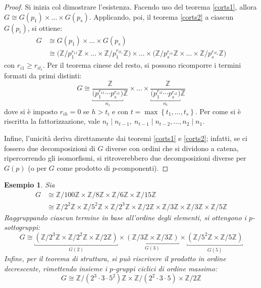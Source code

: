 \documentclass[12pt]{scrartcl}
\theoremstyle{style}
\newtheorem{esempio}{Esempio}[section]
\numberwithin{equation}{subsection}
\begin{document}
	\begin{proof}
		Si inizia col dimostrare l'esistenza. 
		Facendo uso del teorema \ref{corts1}, allora $G \cong G(p_1) \times \ldots \times G(p_s)$. 
		Applicando, poi, il teorema \ref{corts2} a ciascun $G(p_i)$, si ottiene:
		\[
			\begin{split}
				G &\cong G(p_1) \times  \ldots \times G(p_s) \\
				  &\cong \Big(\mathbb{Z}/p_1^{r_{11} }\mathbb{Z} \times \ldots \times \mathbb{Z}/ p_1^{r_{1t_1} }\mathbb{Z}\Big) \times  \ldots \times \Big(\mathbb{Z}/ p_s^{r_{s1} }\mathbb{Z}\times  \ldots\times \mathbb{Z}/p_s^{r_{st_s} }\mathbb{Z}  \Big) 
			\end{split}
		\] 
		con $r_{i 1} \ge r_{i t_i} $. 
		Per il teorema cinese del resto, si possono ricomporre i termini formati da primi distinti:
		\[
			G\cong \frac{\mathbb{Z}}{\underbracket{\big(p_1^{r_{11}} \cdots p_s^{r_{s 1} } \big)}_{n_1} \mathbb{Z}} \times  \ldots \times \frac{\mathbb{Z}}{ \underbracket{\big(p_1^{r_{1t} }\cdots p_s^{r_{st} } \big)}_{n_t} \mathbb{Z}}
		\] 
	dove si \`e imposto $r_{ih} =0$ se $h>t_i$ e con $t = \max \left\{ t_1,\ldots,t_s \right\} $.
	Per come si \`e riscritta la fattorizzazione, vale $n_t  \mid  n_{t-1} , \ n_{t-1}  \mid n_{t-2} , \ldots, n_2 \mid n_1$.

	Infine, l'unicit\`a deriva direttamente dai teoremi \ref{corts1} e \ref{corts2}; infatti, se ci fossero due decomposizioni di $G$ diverse con ordini che si dividono a catena, ripercorrendo gli isomorfismi, si ritroverebbero due decomposizioni diverse per $G(p)$ (o per $G$ come prodotto di $p$-componenti).
	\end{proof}
\begin{esempio}
	Sia 
	\[
		\begin{split}
			G &\cong \mathbb{Z}/100\mathbb{Z} \times \mathbb{Z}/8\mathbb{Z} \times \mathbb{Z}/6\mathbb{Z} \times  \mathbb{Z}/15\mathbb{Z}\\
			  &\cong \mathbb{Z}/2^2\mathbb{Z} \times \mathbb{Z}/5^2\mathbb{Z}\times \mathbb{Z}/2^3 \mathbb{Z}\times \mathbb{Z}/2\mathbb{Z} \times \mathbb{Z}/3\mathbb{Z}\times \mathbb{Z}/3\mathbb{Z}\times \mathbb{Z}/5\mathbb{Z}
		\end{split}
	\] 
	Raggruppando ciascun termine in base all'ordine degli elementi, si ottengono i $p$-sottogruppi:
	\[
		G\cong \underbracket{\left(\mathbb{Z}/2^3 \mathbb{Z}\times \mathbb{Z}/2^2\mathbb{Z} \times \mathbb{Z}/2\mathbb{Z}\right)}_{G(2)}  \times \underbracket{\left(\mathbb{Z}/3\mathbb{Z} \times \mathbb{Z}/3\mathbb{Z}\right) }_{G(3)} \times \underbracket{\left(\mathbb{Z}/5^2 \mathbb{Z} \times \mathbb{Z}/5\mathbb{Z}\right) }_{G(5)} 
	\] 
	Infine, per il teorema di struttura, si pu\`o riscrivere il prodotto in ordine decrescente, rimettendo insieme i $p$-gruppi ciclici di ordine massimo:
	\[
	G\cong \mathbb{Z}/\left(2^3 \cdot 3\cdot 5^{2}\right) \mathbb{Z} \times \mathbb{Z}/\left(2^2 \cdot 3\cdot 5\right) \times \mathbb{Z}/2\mathbb{Z}
	\] 
\end{esempio}
\end{document}
